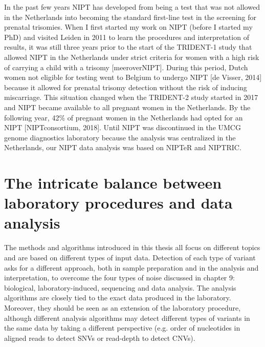 In the past few years NIPT has developed from being a test that was not allowed in the Netherlands into becoming the standard first-line test in the screening for prenatal trisomies. 
When I first started my work on NIPT (before I started my PhD) and visited Leiden in 2011 to learn the procedures and interpretation of results, it was still three years prior to the start of the TRIDENT-1
study that allowed NIPT in the Netherlands under strict criteria for women with a high risk of carrying a child with a trisomy [meeroverNIPT]. 
During this period, Dutch women not eligible for testing went to Belgium to undergo NIPT [de Visser, 2014] because it allowed for prenatal trisomy detection without the risk of inducing miscarriage. 
This situation changed when the TRIDENT-2 study started in 2017 and NIPT became available to all pregnant women in the Netherlands. 
By the following year, 42\% of pregnant women in the Netherlands had opted for an NIPT [NIPTconsortium, 2018]. 
Until NIPT was discontinued in the UMCG genome diagnostics laboratory because the analysis was centralized in the Netherlands, our NIPT data analysis was based on NIPTeR and NIPTRIC.

\section{The intricate balance between laboratory procedures and data analysis}\label{Balance}
The methods and algorithms introduced in this thesis all focus on different topics and are based on different types of input data. 
Detection of each type of variant asks for a different approach, both in sample preparation and in the analysis and interpretation, to overcome the four types of noise 
discussed in chapter 9: biological, laboratory-induced, sequencing and data analysis. 
The analysis algorithms are closely tied to the exact data produced in the laboratory. 
Moreover, they should be seen as an extension of the laboratory procedure, although different analysis algorithms may detect different types of variants in the same data by taking a different perspective (e.g. order of
nucleotides in aligned reads to detect SNVs or read-depth to detect CNVs). 

